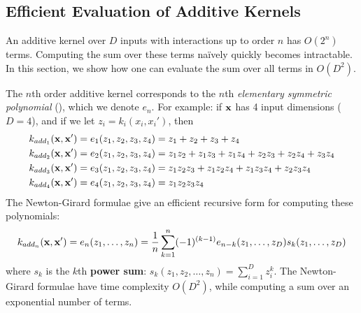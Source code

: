 
\subsection{Efficient Evaluation of Additive Kernels}
An additive kernel over $D$ inputs with interactions up to order $n$ has $O(2^n)$ terms.  Computing the sum over these terms na\"{i}vely quickly becomes intractable.  In this section, we show how one can evaluate the sum over all terms in $O(D^2)$.

The $n$th order additive kernel corresponds to the $n$th \textit{elementary symmetric polynomial} (\cite{macdonald1998symmetric, stanley2001enumerative}), which we denote $e_n$.  For example:  if $\bf x$ has 4 input dimensions ($D = 4$), and if we let $z_i = k_i(x_i,x_i')$, then
\begin{align*}
k_{add_1}({\bf x, x'}) & = e_1( z_1, z_2, z_3, z_4 ) = z_1 + z_2 + z_3 + z_4 \\
k_{add_2}({\bf x, x'}) & = e_2( z_1, z_2, z_3, z_4 ) = z_1 z_2 + z_1 z_3 + z_1z_4 + z_2 z_3 + z_2 z_4 + z_3 z_4 \\
k_{add_3}({\bf x, x'}) & = e_3( z_1, z_2, z_3, z_4 ) = z_1 z_2 z_3 + z_1 z_2 z_4 + z_1 z_3 z_4 + z_2 z_3 z_4 \\
k_{add_4}({\bf x, x'}) & = e_4( z_1, z_2, z_3, z_4 ) = z_1 z_2 z_3 z_4
\end{align*}
The Newton-Girard formulae give an efficient recursive form for computing these polynomials:
\begin{equation}
k_{add_n}({\bf x, x'}) = e_n(z_1,\dots,z_n) = \frac{1}{n} \sum_{k=1}^n (-1)^{(k-1)} e_{n-k}(z_1,\dots,z_D)s_k(z_1,\dots,z_D)
\end{equation}
where $s_k$ is the $k$th {\bf power sum}:
$s_k(z_1,z_2,\dots,z_n) = \sum_{i=1}^Dz_i^k$.
The Newton-Girard formulae have time complexity $O( D^2 )$, while computing a sum over an exponential number of terms.

